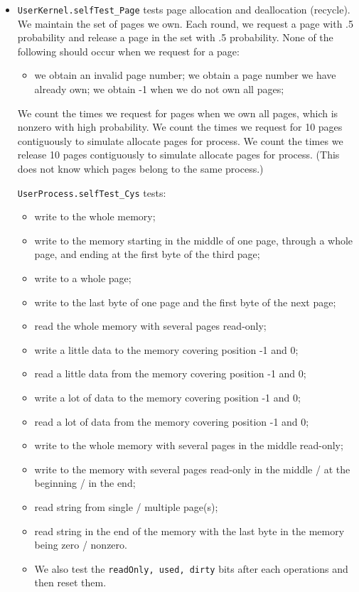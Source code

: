 \documentclass{article}
\begin{document}
\begin{itemize}
\item
\texttt{UserKernel.selfTest\_Page} tests page allocation and deallocation (recycle).
We maintain the set of pages we own.
Each round, we request a page with .5 probability and release a page in the set with .5 probability.
None of the following should occur when we request for a page:
	\begin{itemize}
	\item
	we obtain an invalid page number;
	we obtain a page number we have already own;
	we obtain -1 when we do not own all pages;
	\end{itemize}
We count the times we request for pages when we own all pages, which is nonzero with high probability.
We count the times we request for 10 pages contiguously to simulate allocate pages for process.
We count the times we release 10 pages contiguously to simulate allocate pages for process. (This does not know which pages belong to the same process.)

\texttt{UserProcess.selfTest\_Cys} tests:
	\begin{itemize}
	\item
	write to the whole memory;
	\item
	write to the memory starting in the middle of one page, through a whole page, and ending at the first byte of the third page;
	\item
	write to a whole page;
	\item
	write to the last byte of one page and the first byte of the next page;
	\item
	read the whole memory with several pages read-only;
	\item
	write a little data to the memory covering position -1 and 0;
	\item
	read a little data from the memory covering position -1 and 0;
	\item
	write a lot of data to the memory covering position -1 and 0;
	\item
	read a lot of data from the memory covering position -1 and 0;
	\item
	write to the whole memory with several pages in the middle read-only;
	\item
	write to the memory with several pages read-only in the middle / at the beginning / in the end;
	\item
	read string from single / multiple page(s);
	\item
	read string in the end of the memory with the last byte in the memory being zero / nonzero.
	\item
	We also test the \texttt{readOnly, used, dirty} bits after each operations and then reset them.
	\end{itemize}


\end{itemize}
\end{document}

